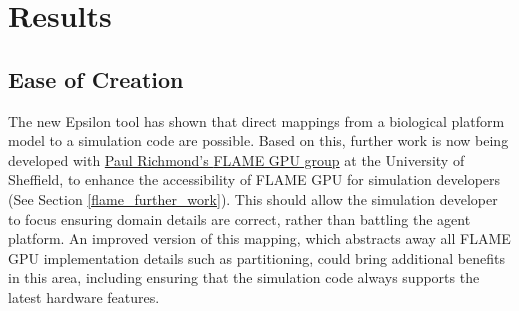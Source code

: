 \documentclass{UoYCSproject}
\begin{document}
\chapter{Results}
\label{results}

\section{Ease of Creation}
The new Epsilon tool has shown that direct mappings from a biological platform model to a simulation code are possible.
Based on this, further work is now being developed with \href{http://paulrichmond.shef.ac.uk/gpu/gpucomputingatsheffield/}{Paul Richmond's \gls{FLAME GPU} group} at the University of Sheffield, to enhance the accessibility of \gls{FLAME GPU} for simulation developers (See Section \ref{flame_further_work}).
This should allow the simulation developer to focus ensuring domain details are correct, rather than battling the agent platform.
An improved version of this mapping, which abstracts away all \gls{FLAME GPU} implementation details such as partitioning, could bring additional benefits in this area, including ensuring that the simulation code always supports the latest hardware features.
\end{document}
